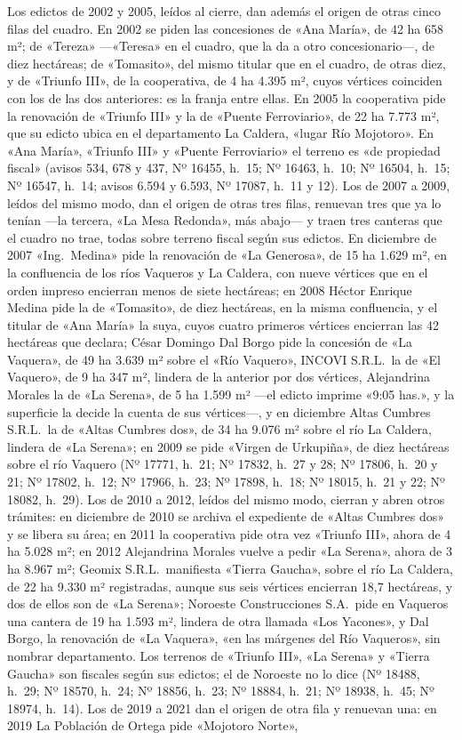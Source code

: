 Los edictos de 2002 y 2005, leídos al cierre, dan además el origen de otras cinco filas del cuadro. En 2002 se piden las concesiones de «Ana María», de 42 ha 658 m²; de «Tereza» ---«Teresa» en el cuadro, que la da a otro concesionario---, de diez hectáreas; de «Tomasito», del mismo titular que en el cuadro, de otras diez, y de «Triunfo III», de la cooperativa, de 4 ha 4.395 m², cuyos vértices coinciden con los de las dos anteriores: es la franja entre ellas. En 2005 la cooperativa pide la renovación de «Triunfo III» y la de «Puente Ferroviario», de 22 ha 7.773 m², que su edicto ubica en el departamento La Caldera, «lugar Río Mojotoro». En «Ana María», «Triunfo III» y «Puente Ferroviario» el terreno es «de propiedad fiscal» (avisos 534, 678 y 437, Nº 16455, h.\ 15; Nº 16463, h.\ 10; Nº 16504, h.\ 15; Nº 16547, h.\ 14; avisos 6.594 y 6.593, Nº 17087, h.\ 11 y 12). Los de 2007 a 2009, leídos del mismo modo, dan el origen de otras tres filas, renuevan tres que ya lo tenían ---la tercera, «La Mesa Redonda», más abajo--- y traen tres canteras que el cuadro no trae, todas sobre terreno fiscal según sus edictos. En diciembre de 2007 «Ing.\ Medina» pide la renovación de «La Generosa», de 15 ha 1.629 m², en la confluencia de los ríos Vaqueros y La Caldera, con nueve vértices que en el orden impreso encierran menos de siete hectáreas; en 2008 Héctor Enrique Medina pide la de «Tomasito», de diez hectáreas, en la misma confluencia, y el titular de «Ana María» la suya, cuyos cuatro primeros vértices encierran las 42 hectáreas que declara; César Domingo Dal Borgo pide la concesión de «La Vaquera», de 49 ha 3.639 m² sobre el «Río Vaquero», INCOVI S.R.L.\ la de «El Vaquero», de 9 ha 347 m², lindera de la anterior por dos vértices, Alejandrina Morales la de «La Serena», de 5 ha 1.599 m² ---el edicto imprime «9:05 has.», y la superficie la decide la cuenta de sus vértices---, y en diciembre Altas Cumbres S.R.L.\ la de «Altas Cumbres dos», de 34 ha 9.076 m² sobre el río La Caldera, lindera de «La Serena»; en 2009 se pide «Virgen de Urkupiña», de diez hectáreas sobre el río Vaquero (Nº 17771, h.\ 21; Nº 17832, h.\ 27 y 28; Nº 17806, h.\ 20 y 21; Nº 17802, h.\ 12; Nº 17966, h.\ 23; Nº 17898, h.\ 18; Nº 18015, h.\ 21 y 22; Nº 18082, h.\ 29). Los de 2010 a 2012, leídos del mismo modo, cierran y abren otros trámites: en diciembre de 2010 se archiva el expediente de «Altas Cumbres dos» y se libera su área; en 2011 la cooperativa pide otra vez «Triunfo III», ahora de 4 ha 5.028 m²; en 2012 Alejandrina Morales vuelve a pedir «La Serena», ahora de 3 ha 8.967 m²; Geomix S.R.L.\ manifiesta «Tierra Gaucha», sobre el río La Caldera, de 22 ha 9.330 m² registradas, aunque sus seis vértices encierran 18,7 hectáreas, y dos de ellos son de «La Serena»; Noroeste Construcciones S.A.\ pide en Vaqueros una cantera de 19 ha 1.593 m², lindera de otra llamada «Los Yacones», y Dal Borgo, la renovación de «La Vaquera», «en las márgenes del Río Vaqueros», sin nombrar departamento. Los terrenos de «Triunfo III», «La Serena» y «Tierra Gaucha» son fiscales según sus edictos; el de Noroeste no lo dice (Nº 18488, h.\ 29; Nº 18570, h.\ 24; Nº 18856, h.\ 23; Nº 18884, h.\ 21; Nº 18938, h.\ 45; Nº 18974, h.\ 14). Los de 2019 a 2021 dan el origen de otra fila y renuevan una: en 2019 La Población de Ortega pide «Mojotoro Norte», 